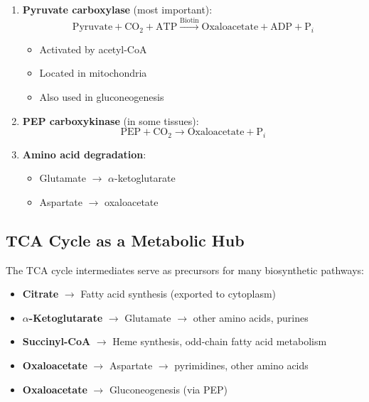 \begin{enumerate}
    \item \textbf{Pyruvate carboxylase} (most important):
    \[
    \text{Pyruvate} + \text{CO}_2 + \text{ATP} \xrightarrow{\text{Biotin}} \text{Oxaloacetate} + \text{ADP} + \text{P}_i
    \]
    \begin{itemize}
        \item Activated by acetyl-CoA
        \item Located in mitochondria
        \item Also used in gluconeogenesis
    \end{itemize}
    
    \item \textbf{PEP carboxykinase} (in some tissues):
    \[
    \text{PEP} + \text{CO}_2 \rightarrow \text{Oxaloacetate} + \text{P}_i
    \]
    
    \item \textbf{Amino acid degradation}:
    \begin{itemize}
        \item Glutamate $\rightarrow$ $\alpha$-ketoglutarate
        \item Aspartate $\rightarrow$ oxaloacetate
    \end{itemize}
\end{enumerate}

\subsection{TCA Cycle as a Metabolic Hub}

\begin{theorem}
The TCA cycle intermediates serve as precursors for many biosynthetic pathways:

\begin{itemize}
    \item \textbf{Citrate} $\rightarrow$ Fatty acid synthesis (exported to cytoplasm)
    \item \textbf{$\alpha$-Ketoglutarate} $\rightarrow$ Glutamate $\rightarrow$ other amino acids, purines
    \item \textbf{Succinyl-CoA} $\rightarrow$ Heme synthesis, odd-chain fatty acid metabolism
    \item \textbf{Oxaloacetate} $\rightarrow$ Aspartate $\rightarrow$ pyrimidines, other amino acids
    \item \textbf{Oxaloacetate} $\rightarrow$ Gluconeogenesis (via PEP)
\end{itemize}
\end{theorem}

